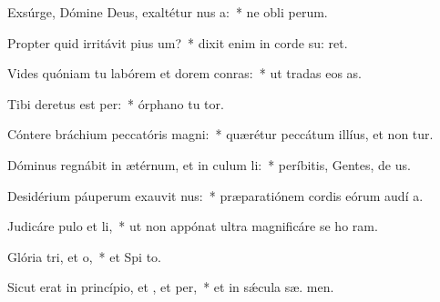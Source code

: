 \item Exsúrge, Dómine Deus, exaltétur nus a:~* ne obli perum.
\item Propter quid irritávit pius um?~* dixit enim in corde su:  ret.
\item Vides quóniam tu labórem et dorem conras:~* ut tradas eos   as.
\item Tibi deretus est per:~* órphano tu  tor.
\item Cóntere bráchium peccatóris  magni:~* quærétur peccátum illíus, et non tur.
\item Dóminus regnábit in ætérnum, et in culum li:~* períbitis, Gentes, de  us.
\item Desidérium páuperum exauvit nus:~* præparatiónem cordis eórum audí  a.
\item Judicáre pulo et li,~* ut non appónat ultra magnificáre se ho  ram.
\item Glória tri, et o,~* et Spi to.
\item Sicut erat in princípio, et , et per,~* et in sǽcula sæ. men.
